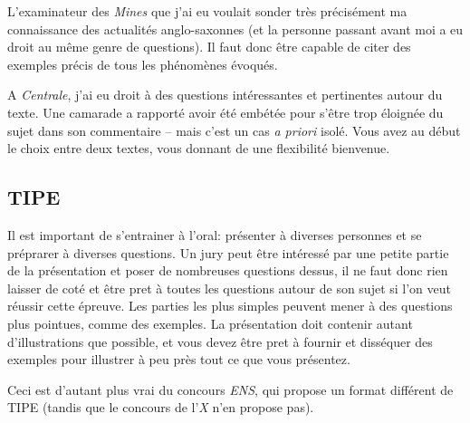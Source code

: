 \documentclass{article}
\begin{document}
L'examinateur des \textit{Mines} que j'ai eu voulait sonder très précisément ma connaissance des actualités anglo-saxonnes (et la personne passant avant moi a eu droit au même genre de questions).
Il faut donc être capable de citer des exemples précis de tous les phénomènes évoqués.

A \textit{Centrale}, j'ai eu droit à des questions intéressantes et pertinentes autour du texte.
Une camarade a rapporté avoir été embétée pour s'être trop éloignée du sujet dans son commentaire -- mais c'est un cas \textit{a priori} isolé.
Vous avez au début le choix entre deux textes, vous donnant de une flexibilité bienvenue.

\subsection{TIPE}
Il est important de s'entrainer à l'oral: présenter à diverses personnes et se préprarer à diverses questions.
Un jury peut être intéressé par une petite partie de la présentation et poser de nombreuses questions dessus, il ne faut donc rien laisser de coté et être pret à toutes les questions autour de son sujet si l'on veut réussir cette épreuve.
Les parties les plus simples peuvent mener à des questions plus pointues, comme des exemples.
La présentation doit contenir autant d'illustrations que possible, et vous devez être pret à fournir et disséquer des exemples pour illustrer à peu près tout ce que vous présentez.

Ceci est d'autant plus vrai du concours \textit{ENS}, qui propose un format différent de TIPE (tandis que le concours de l'\textit{X} n'en propose pas).
\end{document}
